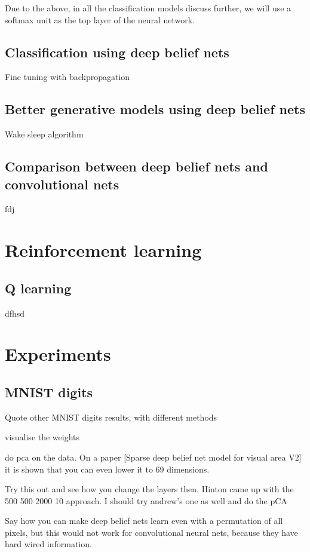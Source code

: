 \documentclass[11pt, fleqn, twoside]{article}
\begin{document}
  Due to the above, in all the classification models discuss further, we will use a softmax unit as the top layer of the neural network.

\subsection{ Classification using deep belief nets}
  Fine tuning with backpropagation

\subsection{Better generative models using deep belief nets}
  Wake sleep algorithm

\subsection{Comparison between deep belief nets and convolutional nets}
fdj


\section{Reinforcement learning}

\subsection{Q learning}
dfhsd

\section{Experiments}

\subsection{MNIST digits}
  Quote other MNIST digits results, with different methods

  visualise the weights

  do pca on the data. On a paper [Sparse deep belief net model for visual area V2]
  it is shown that you can even lower it to 69 dimensions.

  Try this out and see how you change the layers then.
  Hinton came up with the 500 500 2000 10 approach.
  I should try andrew's one as well and do the pCA

  Say how you can make deep belief nets learn even with a permutation of all pixels, but this would not work for convolutional neural nets, because they have hard wired information.
\end{document}
